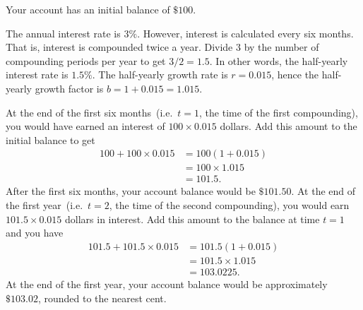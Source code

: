 \documentclass[a4paper,oneside,12pt]{article}
\begin{document}
\begin{solution}
Your account has an initial balance of $\$100$.

The annual interest rate is $3\%$.  However, interest is calculated
every six months.  That is, interest is compounded twice a year.
Divide $3$ by the number of compounding periods per year to get
$3 / 2 = 1.5$.  In other words, the half-yearly interest rate is
$1.5\%$.  The half-yearly growth rate is $r = 0.015$, hence the
half-yearly growth factor is $b = 1 + 0.015 = 1.015$.

At the end of the first six months~(i.e.~$t = 1$, the time of the
first compounding), you would have earned an interest of
$100 \times 0.015$ dollars.  Add this amount to the initial balance to
get
\begin{align*}
100 + 100 \times 0.015
&=
100 (1 + 0.015) \\[4pt]
&=
100 \times 1.015 \\[4pt]
&=
101.5.
\end{align*}
After the first six months, your account balance would be
$\$101.50$.  At the end of the first year~(i.e.~$t = 2$, the time of
the second compounding), you would earn $101.5 \times 0.015$ dollars
in interest.  Add this amount to the balance at time $t = 1$ and you
have
\begin{align*}
101.5 + 101.5 \times 0.015
&=
101.5 (1 + 0.015) \\[4pt]
&=
101.5 \times 1.015 \\[4pt]
&=
103.0225.
\end{align*}
At the end of the first year, your account balance would be
approximately $\$103.02$, rounded to the nearest cent.


\end{solution}
\end{document}
